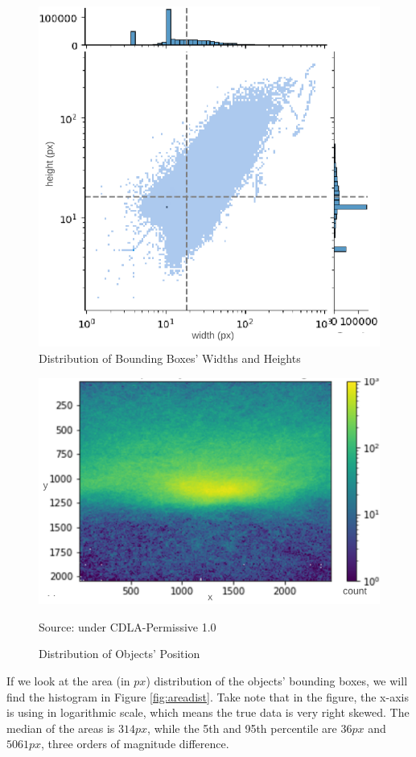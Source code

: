   \begin{figure}
    \centering
    \includegraphics[width=.7\textwidth]{figures/hw-dist.png}
    \caption{Distribution of Bounding Boxes' Widths and Heights}
    \label{fig:hwdist}
  \end{figure}
  \begin{figure}
    \centering
    \includegraphics[width=.7\textwidth]{figures/object-pos-dist.png}
    \caption*{Source: \textcite{aot_dataset} under CDLA-Permissive 1.0}
    \vspace{-1ex}
    \caption{Distribution of Objects' Position}
    \label{fig:objectheatmap}
  \end{figure}

  If we look at the area (in $px$) distribution of the objects' bounding boxes, we will find
  the histogram in Figure \ref{fig:areadist}. Take note that in the figure, the x-axis is 
  using in logarithmic scale, which means the true data is very right skewed.
  The median of the areas is $314 px$, while the 5th and 95th percentile are $36 px$ and $5061 px$, three orders of magnitude difference.


